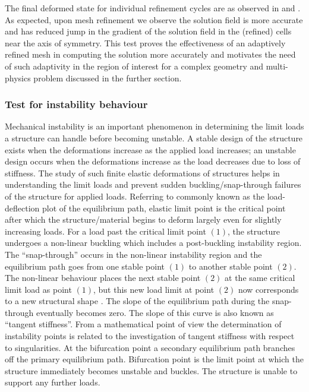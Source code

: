 The final deformed state for individual refinement cycles are as observed in  and . As expected, upon mesh refinement we observe the solution field is more accurate and has reduced jump in the gradient of the solution field in the (refined) cells near the axis of symmetry. This test proves the effectiveness of an adaptively refined mesh in computing the solution more accurately and motivates the need of such adaptivity in the region of interest for a complex geometry and multi-physics problem discussed in the further section.\par  

\subsubsection{Test for instability behaviour}

Mechanical instability is an important phenomenon in determining the limit loads a structure can handle before becoming unstable. A stable design of the structure exists when the deformations increase as the applied load increases; an unstable design occurs when the deformations increase as the load decreases due to loss of stiffness. The study of such finite elastic deformations of structures helps in understanding the limit loads and prevent sudden buckling/snap-through failures of the structure for applied loads. Referring to  commonly known as the load-deflection plot of the equilibrium path, elastic limit point is the critical point after which the structure/material begins to deform largely even for slightly increasing loads. For a load past the critical limit point $(1)$, the structure undergoes a non-linear buckling which includes a post-buckling instability region. The ``snap-through'' occurs in the non-linear instability region and the equilibrium path goes from one stable point $(1)$ to another stable point $(2)$. The non-linear behaviour places the next stable point $(2)$ at the same critical limit load as point $(1)$, but this new load limit at point $(2)$ now corresponds to a new structural shape \cite{Hrinda2010}. The slope of the equilibrium path during the snap-through eventually becomes zero. The slope of this curve is also known as ``tangent stiffness''. From a mathematical point of view the determination of instability points is related to the investigation of tangent stiffness with respect to singularities. At the bifurcation point a secondary equilibrium path branches off the primary equilibrium path. Bifurcation point is the limit point at which the structure immediately becomes unstable and buckles. The structure is unable to support any further loads. \par 

